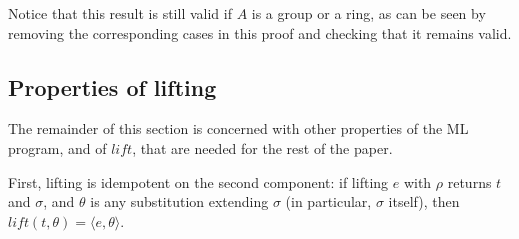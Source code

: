\documentclass{article}
\newcommand{\lift}{\ensuremath{\mathit{lift}}}
\begin{document}
\bigskip Notice that this result is still valid if $A$ is a group or
a ring, as can be seen by removing the corresponding cases in this proof
and checking that it remains valid.

\subsection{Properties of lifting}

The remainder of this section is concerned with other properties of
the ML program, and of $\lift$, that are needed for the rest of the
paper.

First, lifting is idempotent on the second component: if lifting $e$ with
$\rho$ returns $t$ and $\sigma$, and $\theta$ is any substitution extending
$\sigma$ (in particular, $\sigma$ itself), then
$\lift(t,\theta)=\langle e,\theta\rangle$.
\end{document}
